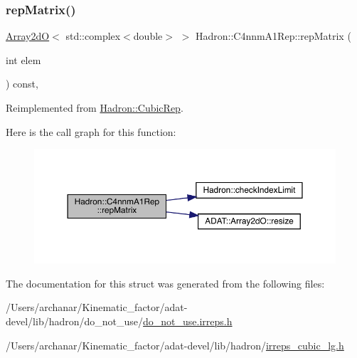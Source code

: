 \subsubsection{\texorpdfstring{repMatrix()}{repMatrix()}\hspace{0.1cm}{\footnotesize\ttfamily [3/3]}}
{\footnotesize\ttfamily \mbox{\hyperlink{classADAT_1_1Array2dO}{Array2dO}}$<$ std\+::complex$<$double$>$ $>$ Hadron\+::\+C4nnm\+A1\+Rep\+::rep\+Matrix (\begin{DoxyParamCaption}\item[{int}]{elem }\end{DoxyParamCaption}) const\hspace{0.3cm}{\ttfamily [inline]}, {\ttfamily [virtual]}}



Reimplemented from \mbox{\hyperlink{structHadron_1_1CubicRep_ac5d7e9e6f4ab1158b5fce3e4ad9e8005}{Hadron\+::\+Cubic\+Rep}}.

Here is the call graph for this function\+:
\nopagebreak
\begin{figure}[H]
\begin{center}
\leavevmode
\includegraphics[width=350pt]{d4/dbc/structHadron_1_1C4nnmA1Rep_afd420b29cea68de99ec5e175a42bafc7_cgraph}
\end{center}
\end{figure}


The documentation for this struct was generated from the following files\+:\begin{DoxyCompactItemize}
\item 
/\+Users/archanar/\+Kinematic\+\_\+factor/adat-\/devel/lib/hadron/do\+\_\+not\+\_\+use/\mbox{\hyperlink{adat-devel_2lib_2hadron_2do__not__use_2do__not__use_8irreps_8h}{do\+\_\+not\+\_\+use.\+irreps.\+h}}\item 
/\+Users/archanar/\+Kinematic\+\_\+factor/adat-\/devel/lib/hadron/\mbox{\hyperlink{adat-devel_2lib_2hadron_2irreps__cubic__lg_8h}{irreps\+\_\+cubic\+\_\+lg.\+h}}\end{DoxyCompactItemize}
